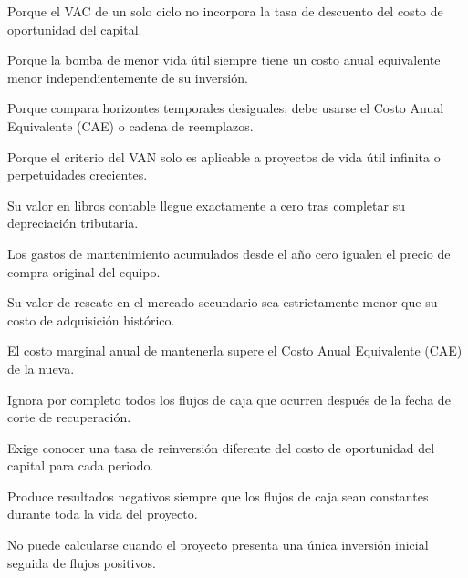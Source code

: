 \begin{opts}
    \item Porque el VAC de un solo ciclo no incorpora la tasa de descuento del costo de oportunidad del capital.
    \item Porque la bomba de menor vida útil siempre tiene un costo anual equivalente menor independientemente de su inversión.
    \item Porque compara horizontes temporales desiguales; debe usarse el Costo Anual Equivalente (CAE) o cadena de reemplazos.
    \item Porque el criterio del VAN solo es aplicable a proyectos de vida útil infinita o perpetuidades crecientes.
\end{opts}

\begin{opts}
    \item Su valor en libros contable llegue exactamente a cero tras completar su depreciación tributaria.
    \item Los gastos de mantenimiento acumulados desde el año cero igualen el precio de compra original del equipo.
    \item Su valor de rescate en el mercado secundario sea estrictamente menor que su costo de adquisición histórico.
    \item El costo marginal anual de mantenerla supere el Costo Anual Equivalente (CAE) de la nueva.
\end{opts}

\begin{opts}
    \item Ignora por completo todos los flujos de caja que ocurren después de la fecha de corte de recuperación.
    \item Exige conocer una tasa de reinversión diferente del costo de oportunidad del capital para cada periodo.
    \item Produce resultados negativos siempre que los flujos de caja sean constantes durante toda la vida del proyecto.
    \item No puede calcularse cuando el proyecto presenta una única inversión inicial seguida de flujos positivos.
\end{opts}

